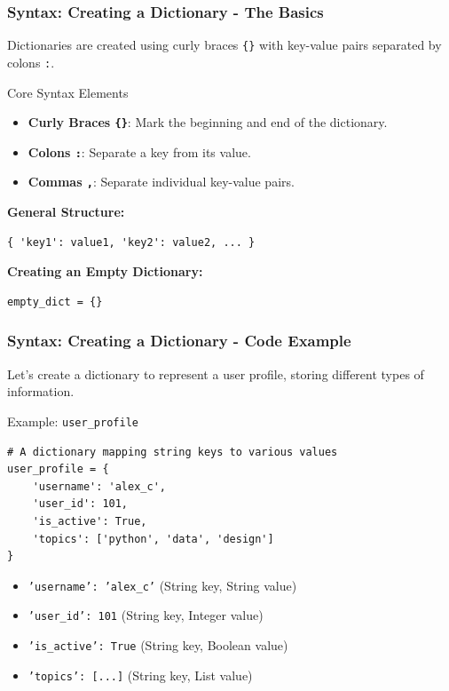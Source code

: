 \documentclass{beamer}
\begin{document}
\begin{frame}[fragile]
    \frametitle{Syntax: Creating a Dictionary - The Basics}
    Dictionaries are created using curly braces \texttt{\{\}} with key-value pairs separated by colons \texttt{:}.

    \begin{block}{Core Syntax Elements}
        \begin{itemize}
            \item \textbf{Curly Braces \texttt{\{\}}}: Mark the beginning and end of the dictionary.
            \item \textbf{Colons \texttt{:}}: Separate a key from its value.
            \item \textbf{Commas \texttt{,}}: Separate individual key-value pairs.
        \end{itemize}
    \end{block}

    \vfill

    \textbf{General Structure:}
    \begin{verbatim}
{ 'key1': value1, 'key2': value2, ... }
    \end{verbatim}

    \textbf{Creating an Empty Dictionary:}
    \begin{verbatim}
empty_dict = {}
    \end{verbatim}
\end{frame}

\begin{frame}[fragile]
    \frametitle{Syntax: Creating a Dictionary - Code Example}
    Let's create a dictionary to represent a user profile, storing different types of information.

    \begin{block}{Example: \texttt{user\_profile}}
\begin{verbatim}
# A dictionary mapping string keys to various values
user_profile = {
    'username': 'alex_c',
    'user_id': 101,
    'is_active': True,
    'topics': ['python', 'data', 'design']
}
\end{verbatim}
    \end{block}

    \begin{itemize}
        \item \texttt{'username': 'alex\_c'} \hfill (String key, String value)
        \item \texttt{'user\_id': 101} \hfill (String key, Integer value)
        \item \texttt{'is\_active': True} \hfill (String key, Boolean value)
        \item \texttt{'topics': [...]} \hfill (String key, List value)
    \end{itemize}
\end{frame}
\end{document}
